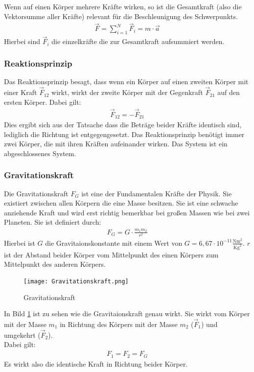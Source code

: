 \documentclass{article}
\begin{document}
\noindent Wenn auf einen Körper mehrere Kräfte wirken, so ist die Gesamtkraft (also die Vektorsumme aller Kräfte) relevant für die 
Beschleunigung des Schwerpunkts.
\begin{align}
    \vec{F}=\sum_{i=1}^{N}\vec{F}_i=m\cdot \vec{a}
\end{align}
Hierbei sind $\vec{F}_i$ die einzelkräfte die zur Gesamtkraft aufsummiert werden.


\subsubsection*{Reaktionsprinzip}
Das Reaktionsprinzip besagt, dass wenn ein Körper auf einen zweiten Körper mit einer Kraft $\vec{F}_{12}$ wirkt, wirkt der 
zweite Körper mit der Gegenkraft $\vec{F}_{21}$ auf den ersten Körper.
Dabei gilt:
\begin{align}
    \vec{F}_{12}=-\vec{F}_{21}
\end{align}
Dies ergibt sich aus der Tatsache dass die Beträge beider Kräfte identisch sind, lediglich die Richtung ist entgegengesetzt.
Das Reaktionsprinzip benötigt immer zwei Körper, die mit ihren Kräften aufeinander wirken.
Das System ist ein abgeschlossenes System.

\subsubsection{Gravitationskraft}
Die Gravitationskraft $F_G$ ist eine der Fundamentalen Kräfte der Physik. Sie existiert zwischen allen Körpern
die eine Masse besitzen. Sie ist eine schwache anziehende Kraft und wird erst richtig bemerkbar bei großen Massen wie bei
zwei Planeten. Sie ist definiert durch:
\begin{align}
    F_G=G\cdot \frac{m_1m_2}{r^2}
\end{align}
Hierbei ist $G$ die Gravitaionskonstante mit einem Wert von 
$G=6,67\cdot10^{-11}\frac{\mathrm{Nm}^2}{\mathrm{Kg}^2}$. $r$ ist der Abstand beider Körper vom Mittelpunkt des einen Körpers
zum Mittelpunkt des anderen Körpers.

\begin{figure}[H]  %
    \centering      %
    \texttt{[image: Gravitationskraft.png]} %
    \caption{Gravitationskraft} %
    \label{fig:Gravitaionskraft} %
\end{figure}
\noindent In Bild \ref{fig:Gravitaionskraft} ist zu sehen wie die Gravitaionskraft genau wirkt. Sie wirkt vom Körper 
mit der Masse $m_1$ in Richtung des Körpers mit der Masse $m_2$ ($\vec{F}_1$) und umgekehrt ($\vec{F}_2$).\\
Dabei gilt:
\begin{align}
    F_1=F_2=F_G
\end{align}
Es wirkt also die identische Kraft in Richtung beider Körper.\\
\end{document}
